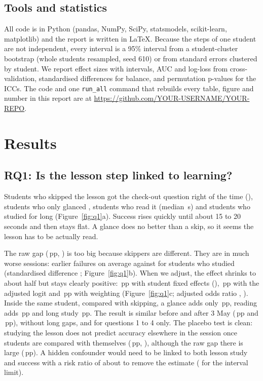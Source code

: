 \documentclass[11pt,a4paper]{article}
\newcommand{\pp}{\,pp}
\newcommand{\repourl}{https://github.com/YOUR-USERNAME/YOUR-REPO}   %
\begin{document}
\subsection{Tools and statistics}
All code is in Python (pandas, NumPy, SciPy, statsmodels, scikit-learn, matplotlib) and the report is written in \LaTeX. Because the steps of one student are not independent, every interval is a 95\% interval from a student-cluster bootstrap (whole students resampled, seed 610) or from standard errors clustered by student. We report effect sizes with intervals, AUC and log-loss from cross-validation, standardised differences for balance, and permutation p-values for the ICCs. The code and one \texttt{run\_all} command that rebuilds every table, figure and number in this report are at \url{\repourl}.

\section{Results}
\subsection{RQ1: Is the lesson step linked to learning?}
Students who skipped the lesson got the check-out question right \qOneSuccSkip{} of the time (\qOneSuccSkipCI), students who only glanced \qOneSuccGlance, students who read it (median \qOneMedRead\,s) \qOneSuccRead{} and students who studied for long \qOneSuccLong{} (Figure~\ref{fig:q1}a). Success rises quickly until about 15 to 20 seconds and then stays flat. A glance does no better than a skip, so it seems the lesson has to be actually read.

The raw gap (\qOneEffRaw\pp, \qOneEffRawCI) is too big because skippers are different. They are in much worse sessions: \qOneSkipEarlierFail{} earlier failures on average against \qOneLessonEarlierFail{} for students who studied (standardised difference \qOneSMDfail; Figure~\ref{fig:q1}b). When we adjust, the effect shrinks to about half but stays clearly positive: \qOneEffFE\pp{} with student fixed effects (\qOneEffFECI), \qOneEffLogit\pp{} with the adjusted logit and \qOneEffIPW\pp{} with weighting (Figure~\ref{fig:q1}c; adjusted odds ratio \qOneOR, \qOneORCI). Inside the same student, compared with skipping, a glance adds only \qOneDoseFEGlance\pp{}, reading adds \qOneDoseFERead\pp{} and long study \qOneDoseFELong\pp. The result is similar before and after 3 May (\qOneFEBefore\pp{} and \qOneFEAfter\pp), without long gaps, and for questions 1 to 4 only. The placebo test is clean: studying the lesson does not predict accuracy elsewhere in the session once students are compared with themselves (\qOnePlacebo\pp, \qOnePlaceboCI), although the raw gap there is large (\qOnePlaceboRaw\pp). A hidden confounder would need to be linked to both lesson study and success with a risk ratio of about \qOneEvalue{} to remove the estimate (\qOneEvalueCI{} for the interval limit).
\end{document}
